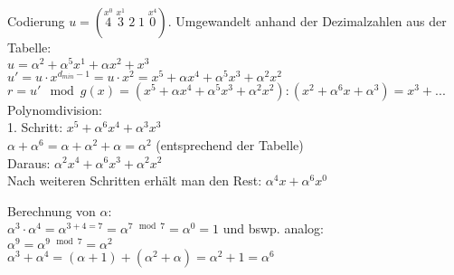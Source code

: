 \documentclass{scrreprt}
\begin{document}
\begin{enumerate}
Codierung $u=(\overset{x^0}{4}\;\overset{x^1}{3}\;2\;1\;\overset{x^4}{0})$. Umgewandelt anhand der Dezimalzahlen aus der Tabelle:\\
$u=\alpha^2 + \alpha^5 x^1 + \alpha x^2 + x^3$\\
$u'=u\cdot x^{d_{min}-1}=u\cdot x^2 = x^5 + \alpha x^4+\alpha^5 x^3 + \alpha^2x^2$\\
$r=u' \mod g(x)= (x^5 + \alpha x^4+\alpha^5 x^3 + \alpha^2x^2):(x^2+\alpha^6x+\alpha^3)=x^3+...$\\
Polynomdivision:\\
1. Schritt: $x^5+\alpha^6x^4+\alpha^3x^3$\\
$\alpha + \alpha^6 = \alpha + \alpha^2+\alpha = \alpha^2$ (entsprechend der Tabelle)\\
Daraus: $\alpha^2 x^4+\alpha^6x^3+\alpha^2x^2$\\
Nach weiteren Schritten erhält man den Rest: $\alpha^4x+\alpha^6x^0$

Berechnung von $\alpha$:\\
$\alpha^3\cdot \alpha^4=\alpha^{3+4=7}=\alpha^{7\mod 7} =\alpha^0=1$ und bswp. analog: \\
$\alpha^9 = \alpha^{9\mod 7}=\alpha^2$\\
$\alpha^3+\alpha^4 = (\alpha+1) +(\alpha^2+\alpha) = \alpha^2+1 = \alpha^6$
\end{enumerate}



\end{document}
